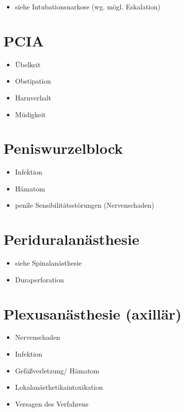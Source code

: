 \documentclass[
]{book}
\providecommand{\tightlist}{%
  \setlength{\itemsep}{0pt}\setlength{\parskip}{0pt}}
\begin{document}
\begin{itemize}
\tightlist
\item
  siehe Intubationsnarkose (wg. mögl. Eskalation)
\end{itemize}

\hypertarget{pcia}{%
\section{PCIA}\label{pcia}}

\begin{itemize}
\tightlist
\item
  Übelkeit
\item
  Obstipation
\item
  Harnverhalt
\item
  Müdigkeit
\end{itemize}

\hypertarget{peniswurzelblock}{%
\section{Peniswurzelblock}\label{peniswurzelblock}}

\begin{itemize}
\tightlist
\item
  Infektion
\item
  Hämatom
\item
  penile Sensibilitätsstörungen (Nervenschaden)
\end{itemize}

\hypertarget{periduralanuxe4sthesie}{%
\section{Periduralanästhesie}\label{periduralanuxe4sthesie}}

\begin{itemize}
\tightlist
\item
  siehe Spinalanästhesie
\item
  Duraperforation
\end{itemize}

\hypertarget{plexusanuxe4sthesie-axilluxe4r}{%
\section{Plexusanästhesie (axillär)}\label{plexusanuxe4sthesie-axilluxe4r}}

\begin{itemize}
\tightlist
\item
  Nervenschaden
\item
  Infektion
\item
  Gefäßverletzung/ Hämatom
\item
  Lokalanästhetikaintoxikation
\item
  Versagen des Verfahrens
\end{itemize}
\end{document}

